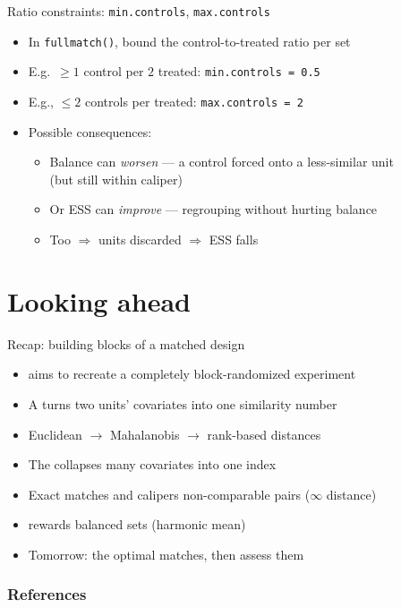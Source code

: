 \documentclass[table, xcolor = {dvipsnames}, 9pt]{beamer}
\theoremstyle{plain}
\newcommand{\mh}[1]{{\color{magenta}{#1}}}
\begin{document}
\begin{frame}[t]{Ratio constraints: \texttt{min.controls}, \texttt{max.controls}}
\vfill
\begin{itemize} \vfill
\item In \texttt{fullmatch()}, bound the control-to-treated ratio per set \vfill
\item E.g.\ $\geq 1$ control per $2$ treated: \texttt{min.controls = 0.5} \vfill
\item E.g., $\leq 2$ controls per treated: \texttt{max.controls = 2} \vfill
\item Possible consequences: \vfill
\begin{itemize} \vfill
\item Balance can \emph{worsen} --- a control forced onto a less-similar unit \\ 
 (but still within caliper) \vfill
\item Or ESS can \emph{improve} --- regrouping without hurting balance \vfill
\item Too \mh{stringent} $\Rightarrow$ units discarded $\Rightarrow$ ESS falls \vfill
\end{itemize} \vfill
\end{itemize} \vfill
\end{frame}
\section{Looking ahead}

\begin{frame}[t]{Recap: building blocks of a matched design}
\vfill
\begin{itemize} \vfill
\item \mh{Matching} aims to recreate a completely block-randomized experiment \vfill
\item A \mh{distance} turns two units' covariates into one similarity number \vfill
\item Euclidean $\to$ Mahalanobis $\to$ rank-based distances \vfill
\item The \mh{propensity score} collapses many covariates into one index \vfill
\item Exact matches and calipers \mh{forbid} non-comparable pairs ($\infty$ distance) \vfill
\item \mh{Effective sample size} rewards balanced sets (harmonic mean) \vfill
\item Tomorrow: \mh{construct} the optimal matches, then assess them \vfill
\end{itemize} \vfill
\end{frame}
\begin{frame}[allowframebreaks]
\frametitle{References}
\scriptsize


\end{frame}
\end{document}
